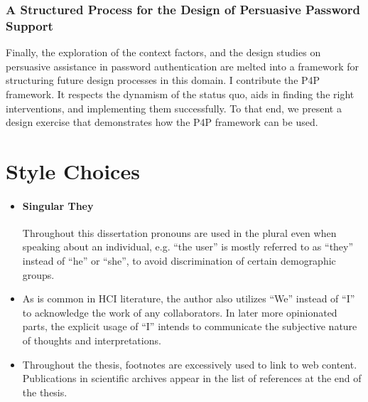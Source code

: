\subsubsection{A Structured Process for the Design of Persuasive Password Support}
Finally, the exploration of the context factors, and the design studies on persuasive assistance in password authentication are melted into a framework for structuring future design processes in this domain. I contribute the \gls{P4P} framework. It respects the dynamism of the status quo, aids in finding the right interventions, and implementing them successfully. To that end, we present a design exercise that demonstrates how the \gls{P4P} framework can be used. 




\section{Style Choices}
\begin{itemize}
\item \paragraph{Singular They} Throughout this dissertation pronouns are used in the plural even when speaking about an individual, e.g. ``the user'' is mostly referred to as ``they'' instead of ``he'' or ``she'', to avoid discrimination of certain demographic groups. 
\item As is common in HCI literature, the author also utilizes ``We'' instead of ``I'' to acknowledge the work of any collaborators. In later more opinionated parts, the explicit usage of ``I'' intends to communicate the subjective nature of thoughts and interpretations.
\item Throughout the thesis, footnotes are excessively used to link to web content. Publications in scientific archives appear in the list of references at the end of the thesis.
\end{itemize}


